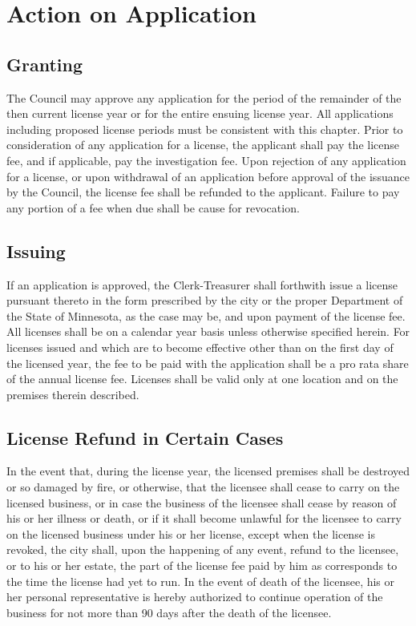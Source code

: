 \section{Action on Application}
\subsection{Granting}
The Council may approve any application for the period of the remainder of the then current license year or for the entire ensuing license year.  All applications including proposed license periods must be consistent with this chapter.  Prior to consideration of any application for a license, the applicant shall pay the license fee, and if applicable, pay the investigation fee.  Upon rejection of any application for a license, or upon withdrawal of an application before approval of the issuance by the Council, the license fee shall be refunded to the applicant.  Failure to pay any portion of a fee when due shall be cause for revocation.
\subsection{Issuing}
If an application is approved, the Clerk-Treasurer shall forthwith issue a license pursuant thereto in the form prescribed by the city or the proper Department of the State of Minnesota, as the case may be, and upon payment of the license fee.  All licenses shall be on a calendar year basis unless otherwise specified herein.  For licenses issued and which are to become effective other than on the first day of the licensed year, the fee to be paid with the application shall be a pro rata share of the annual license fee.  Licenses shall be valid only at one location and on the premises therein described.
\subsection{License Refund in Certain Cases}
In the event that, during the license year, the licensed premises shall be destroyed or so damaged by fire, or otherwise, that the licensee shall cease to carry on the licensed business, or in case the business of the licensee shall cease by reason of his or her illness or death, or if it shall become unlawful for the licensee to carry on the licensed business under his or her license, except when the license is revoked, the city shall, upon the happening of any event, refund to the licensee, or to his or her estate, the part of the license fee paid by him as corresponds to the time the license had yet to run.  In the event of death of the licensee, his or her personal representative is hereby authorized to continue operation of the business for not more than 90 days after the death of the licensee.
